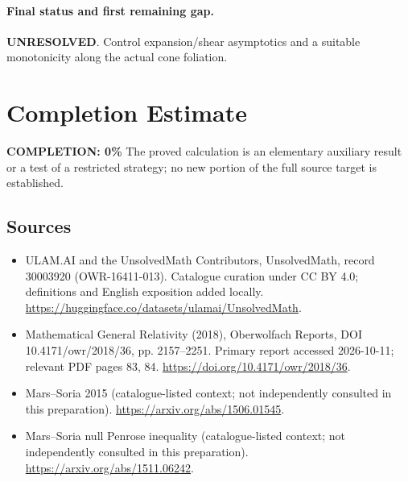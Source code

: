 \documentclass[11pt]{article}
\begin{document}
\paragraph{Final status and first remaining gap.}
\textbf{UNRESOLVED}. Control expansion/shear asymptotics and a suitable monotonicity along the actual cone foliation.

\section{Completion Estimate}
\noindent\textbf{COMPLETION: 0\%}
The proved calculation is an elementary auxiliary result or a test of a restricted strategy; no new portion of the full source target is established.

\subsection{Sources}
\begin{itemize}
\item[\hypertarget{source:30003920:1}{S1}] ULAM.AI and the UnsolvedMath Contributors, UnsolvedMath, record 30003920 (OWR-16411-013). Catalogue curation under CC BY 4.0; definitions and English exposition added locally.
\url{https://huggingface.co/datasets/ulamai/UnsolvedMath}.
\item[\hypertarget{source:30003920:2}{S2}] Mathematical General Relativity (2018), Oberwolfach Reports, DOI 10.4171/owr/2018/36, pp. 2157--2251. Primary report accessed 2026-10-11; relevant PDF pages 83, 84.
\url{https://doi.org/10.4171/owr/2018/36}.
\item[\hypertarget{source:30003920:3}{S3}] Mars--Soria 2015 (catalogue-listed context; not independently consulted in this preparation).
\url{https://arxiv.org/abs/1506.01545}.
\item[\hypertarget{source:30003920:4}{S4}] Mars--Soria null Penrose inequality (catalogue-listed context; not independently consulted in this preparation).
\url{https://arxiv.org/abs/1511.06242}.
\end{itemize}
\label{end:30003920}
\end{document}
